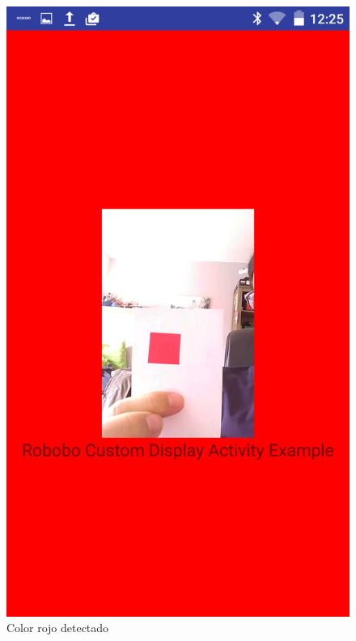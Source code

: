 \begin{figure}
\centering
\begin{minipage}{0.45\textwidth}
\centering
\includegraphics[width=1\linewidth]{imagenes/color_detection_red.png}
\caption{Color rojo detectado}
\label{fig:red_color}


\end{minipage}
\end{figure}
